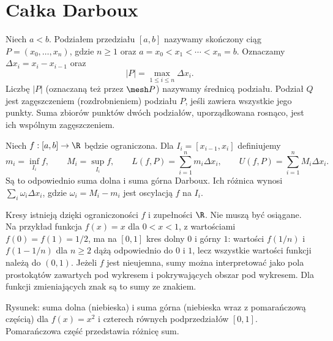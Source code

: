 \section{Całka Darboux}
\providecommand{\atlasref}[2]{#2}
\begin{definicja}
\label{ma1:def:riemann-partition}
Niech $a<b$. Podziałem przedziału $[a,b]$ nazywamy skończony ciąg $P=(x_0,\ldots,x_n)$, gdzie $n\ge1$ oraz $a=x_0<x_1<\cdots<x_n=b$. Oznaczamy $\Delta x_i=x_i-x_{i-1}$ oraz
\[
 |P|=\max_{1\le i\le n}\Delta x_i.
\]
Liczbę $|P|$ (oznaczaną też przez $\mesh P$) nazywamy średnicą podziału. Podział $Q$ jest zagęszczeniem (rozdrobnieniem) podziału $P$, jeśli zawiera wszystkie jego punkty. Suma zbiorów punktów dwóch podziałów, uporządkowana rosnąco, jest ich wspólnym zagęszczeniem.
\end{definicja}
\begin{definicja}
\label{ma1:def:darboux-sums}
Niech $f:[a,b]\to\R$ będzie ograniczona. Dla $I_i=[x_{i-1},x_i]$ definiujemy
\[
 m_i=\inf_{I_i}f,\qquad M_i=\sup_{I_i}f,\qquad
 L(f,P)=\sum_{i=1}^n m_i\Delta x_i,\qquad
 U(f,P)=\sum_{i=1}^n M_i\Delta x_i.
\]
Są to odpowiednio suma dolna i suma górna Darboux. Ich różnica wynosi $\sum_i\omega_i\Delta x_i$, gdzie $\omega_i=M_i-m_i$ jest oscylacją $f$ na $I_i$.
\end{definicja}
Kresy istnieją dzięki ograniczoności $f$ i zupełności $\R$. Nie muszą być osiągane. Na przykład funkcja $f(x)=x$ dla $0<x<1$, z wartościami $f(0)=f(1)=1/2$, ma na $[0,1]$ kres dolny $0$ i górny $1$: wartości $f(1/n)$ i $f(1-1/n)$ dla $n\ge2$ dążą odpowiednio do $0$ i $1$, lecz wszystkie wartości funkcji należą do $(0,1)$. Jeżeli $f$ jest nieujemna, sumy można interpretować jako pola prostokątów zawartych pod wykresem i pokrywających obszar pod wykresem. Dla funkcji zmieniających znak są to sumy ze znakiem.

\begin{center}

\small Rysunek: suma dolna (niebieska) i suma górna (niebieska wraz z pomarańczową częścią) dla $f(x)=x^2$ i czterech równych podprzedziałów $[0,1]$. Pomarańczowa część przedstawia różnicę sum.
\end{center}

